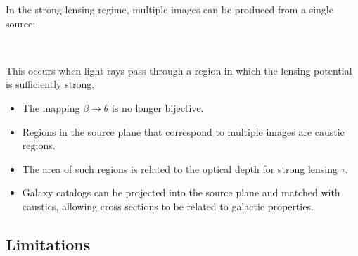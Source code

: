 \documentclass{beamer}
\begin{document}
  \begin{frame}
    In the strong lensing regime, multiple images can be produced from a single source:
    \\
    \centering
    \\
    \raggedright
    This occurs when light rays pass through a region in which the lensing potential is sufficiently strong.
  \end{frame}

  \begin{frame}
    \begin{itemize}
      \item The mapping $\beta\rightarrow\theta$ is no longer bijective.
      \item Regions in the source plane that correspond to multiple images are caustic regions.
      \item The area of such regions is related to the optical depth for strong lensing $\tau$.
      \item Galaxy catalogs can be projected into the source plane and matched with caustics, allowing cross sections to be related to galactic properties.
    \end{itemize}
  \end{frame}


  \subsection{Limitations}
\end{document}

